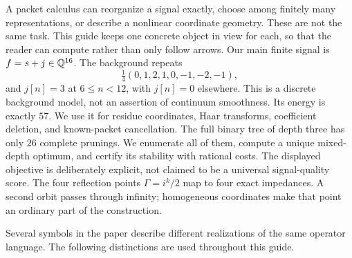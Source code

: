 A packet calculus can reorganize a signal exactly, choose among finitely many representations, or describe a nonlinear coordinate geometry. These are not the same task. This guide keeps one concrete object in view for each, so that the reader can compute rather than only follow arrows.
Our main finite signal is $f=s+j\in\mathbb Q^{16}$. The background repeats
\[
\tfrac14(0,1,2,1,0,-1,-2,-1),
\]
and $j[n]=3$ at $6\le n<12$, with $j[n]=0$ elsewhere. This is a discrete background model, not an assertion of continuum smoothness. Its energy is exactly $57$. We use it for residue coordinates, Haar transforms, coefficient deletion, and known-packet cancellation.
The full binary tree of depth three has only $26$ complete prunings. We enumerate all of them, compute a unique mixed-depth optimum, and certify its stability with rational costs. The displayed objective is deliberately explicit, not claimed to be a universal signal-quality score.
The four reflection points $\Gamma=i^k/2$ map to four exact impedances. A second orbit passes through infinity; homogeneous coordinates make that point an ordinary part of the construction.

Several symbols in the paper describe different realizations of the same operator language. The following distinctions are used throughout this guide.

